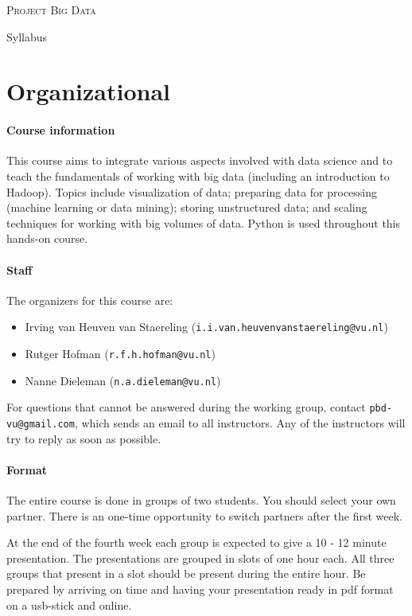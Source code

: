 \documentclass[a4paper]{report}
\newcommand{\blankline}{\par\vspace{5mm}}
\begin{document}
	
\begin{center}
	\textsc{\Large Project Big Data}
	\blankline
	{\large Syllabus}
\end{center}

\section*{Organizational}

\paragraph{Course information}
This course aims to integrate various aspects involved with data science and to teach the fundamentals of working with big data (including an
introduction to Hadoop). Topics include visualization of data; preparing data for processing (machine learning or data mining); storing unstructured data; and scaling techniques for working with big volumes of data. Python is used throughout this hands-on course.

\paragraph{Staff}
The organizers for this course are:
\begin{itemize}
	\setlength\itemsep{0mm}
	\item Irving van Heuven van Staereling (\texttt{i.i.van.heuvenvanstaereling@vu.nl})
	\item Rutger Hofman (\texttt{r.f.h.hofman@vu.nl})
	\item Nanne Dieleman (\texttt{n.a.dieleman@vu.nl})
\end{itemize}
For questions that cannot be answered during the working group, contact \texttt{pbd-vu@gmail.com}, which sends an email to all instructors. Any of the instructors will try to reply as soon as possible.

\paragraph{Format}
The entire course is done in groups of two students. You should select your own partner. There is an one-time opportunity to switch partners after the first week.

At the end of the fourth week each group is expected to give a 10 - 12 minute presentation. The presentations are grouped in slots of one hour each. All three groups that present in a slot should be present during the entire hour. Be prepared by arriving on time and having your presentation ready in pdf format on a usb-stick and online.
\end{document}
